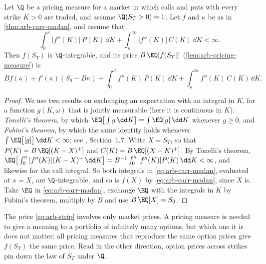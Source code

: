 \begin{corollary}\label{cor:arb-strip}
Let $\Q$ be a pricing measure for a market in which calls and puts with every strike $K>0$
are traded, and assume $\Q(S_T>0)=1$. Let $f$ and $\kappa$ be as in \cref{thm:arb-carr-madan},
and assume that
\begin{equation}\label{eq:arb-strip-integrable}
  \int_0^\kappa|f''(K)|\,P(K)\,\dd K+\int_\kappa^\infty|f''(K)|\,C(K)\,\dd K<\infty .
\end{equation}
Then $f(S_T)$ is $\Q$-integrable, and its price $B\,\EQ[f(S_T)]$ (\cref{lem:arb-pricing-measure})
is
\begin{equation}\label{eq:arb-strip}
  Bf(\kappa)+f'(\kappa)(S_0-B\kappa)+\int_0^\kappa f''(K)\,P(K)\,\dd K
  +\int_\kappa^\infty f''(K)\,C(K)\,\dd K .
\end{equation}
\end{corollary}

\begin{proof}
We use two results on exchanging an expectation with an integral in $K$, for a function
$g(K,\omega)$ that is jointly measurable (here it is continuous in $K$): \emph{Tonelli's
theorem}, by which $\EQ\big[\int g\,\dd K\big]=\int\EQ[g]\,\dd K$ whenever $g\ge0$, and
\emph{Fubini's theorem}, by which the same identity holds whenever
$\int\EQ\big[|g|\big]\,\dd K<\infty$; see \textcite{durrett}, Section~1.7. Write $X=S_T$, so
that $P(K)=B\,\EQ[(K-X)^+]$ and $C(K)=B\,\EQ[(X-K)^+]$. By Tonelli's theorem,
$\EQ\big[\int_0^\kappa|f''(K)|(K-X)^+\,\dd K\big]=B^{-1}\int_0^\kappa|f''(K)|P(K)\,\dd K<\infty$,
and likewise for the call integral. So both integrals in \eqref{eq:arb-carr-madan}, evaluated
at $x=X$, are $\Q$-integrable, and so is $f(X)$ by \eqref{eq:arb-carr-madan}, since $X$ is.
Take $\EQ$ in \eqref{eq:arb-carr-madan}, exchange $\EQ$ with the integrals in $K$ by
Fubini's theorem, multiply by $B$ and use $B\,\EQ[X]=S_0$.
\end{proof}

The price \eqref{eq:arb-strip} involves only market prices. A pricing measure is needed to
give a meaning to a portfolio of infinitely many options, but which one it is does not
matter: all pricing measures that reproduce the same option prices give $f(S_T)$ the same
price. Read in the other direction, option prices across strikes pin down the law of $S_T$
under $\Q$.

